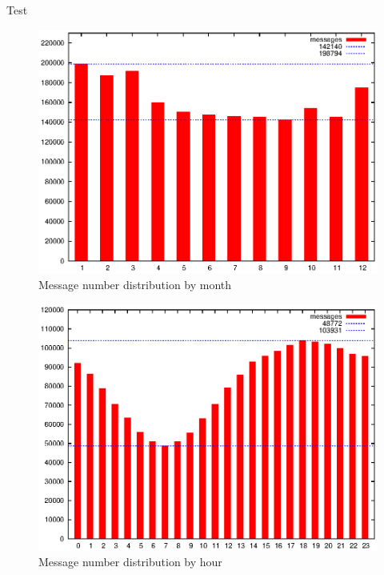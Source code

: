     Test
    
    \begin{figure}[H]
      \includegraphics[width=\textwidth]{chapters/03_implementation/monthly}
      \caption{Message number distribution by month}
      \label{fig:dist_month}
    \end{figure}
    
    \begin{figure}[H]
      \includegraphics[width=\textwidth]{chapters/03_implementation/hourly}
      \caption{Message number distribution by hour}
      \label{fig:dist_hour}
    \end{figure}